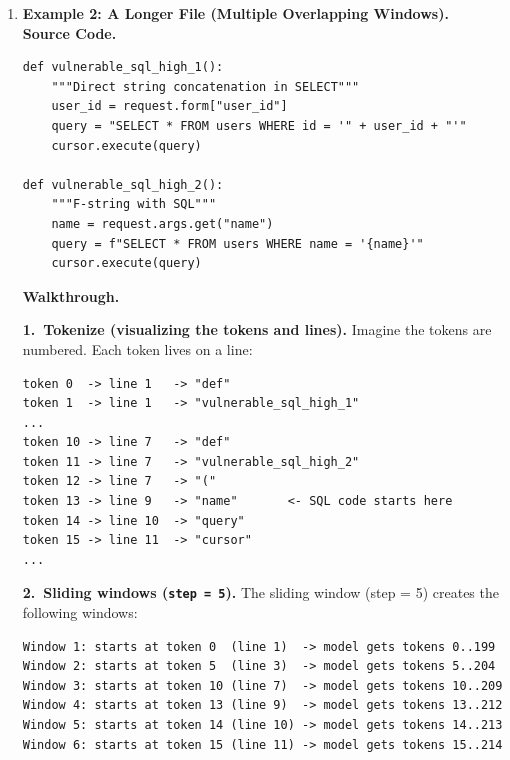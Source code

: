\begin{enumerate}
  \textbf{3.~Vectorize.} The 35 tokens are converted to 300-dimension vectors and padded
  with zeros up to length 200. The input tensor \texttt{X} has shape \texttt{(1, 200, 300)}.

  \textbf{4.~Prediction.} The model evaluates this single window and outputs one number,
  for example \texttt{prob = 0.97}.

  \textbf{5.~Threshold \& line reporting.} Since \texttt{0.97 >= 0.5}, a vulnerability is
  reported. The window starts at token index 0, which maps to line~1.

  \textbf{6.~Deduplication.} Only one report exists, so deduplication does nothing.

  \textbf{Result.} A single vulnerability is reported for the file at line~1.

  \item \textbf{Example 2: A Longer File (Multiple Overlapping Windows).}\\
  \textbf{Source Code.}

\begin{lstlisting}[style=pycode]
def vulnerable_sql_high_1():
    """Direct string concatenation in SELECT"""
    user_id = request.form["user_id"]
    query = "SELECT * FROM users WHERE id = '" + user_id + "'"
    cursor.execute(query)

def vulnerable_sql_high_2():
    """F-string with SQL"""
    name = request.args.get("name")
    query = f"SELECT * FROM users WHERE name = '{name}'"
    cursor.execute(query)
\end{lstlisting}

  \textbf{Walkthrough.}

  \textbf{1.~Tokenize (visualizing the tokens and lines).} Imagine the tokens are numbered.
  Each token lives on a line:

\begin{verbatim}
token 0  -> line 1   -> "def"
token 1  -> line 1   -> "vulnerable_sql_high_1"
...
token 10 -> line 7   -> "def"
token 11 -> line 7   -> "vulnerable_sql_high_2"
token 12 -> line 7   -> "("
token 13 -> line 9   -> "name"       <- SQL code starts here
token 14 -> line 10  -> "query"
token 15 -> line 11  -> "cursor"
...
\end{verbatim}

  \textbf{2.~Sliding windows (\texttt{step = 5}).} The sliding window (step = 5) creates the
  following windows:

\begin{verbatim}
Window 1: starts at token 0  (line 1)  -> model gets tokens 0..199
Window 2: starts at token 5  (line 3)  -> model gets tokens 5..204
Window 3: starts at token 10 (line 7)  -> model gets tokens 10..209
Window 4: starts at token 13 (line 9)  -> model gets tokens 13..212
Window 5: starts at token 14 (line 10) -> model gets tokens 14..213
Window 6: starts at token 15 (line 11) -> model gets tokens 15..214
\end{verbatim}


\end{enumerate}
